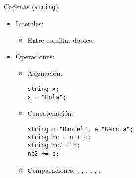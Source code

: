 \begin{frame}[fragile]{Cadenas (\texttt{string})}
\begin{itemize}
  \item Literales:
    \begin{itemize}
      \item Entre comillas dobles: 
    \end{itemize}
  \item Operaciones:
    \begin{itemize}
      \item Asignación:
\begin{lstlisting}
string x;
x = "Hola";
\end{lstlisting}
      \item Concatenación:
\begin{lstlisting}
string n="Daniel", a="Garcia";
string nc = n + c;
string nc2 = n;
nc2 += c;
\end{lstlisting}
      \item Comparaciones:
        \cppkey{==},
        \cppkey{!=},
        \cppkey{<},
        \cppkey{<=},
        \cppkey{>},
        \cppkey{>=}.
    \end{itemize}
\end{itemize}
\end{frame}

